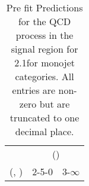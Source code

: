 \begin{table}[h!]
\tiny
\centering
\caption{Pre fit Predictions for the QCD process in the signal region for 2.1\ifb for monojet categories. All entries are non-zero but are truncated to one decimal place.\label{tab:predsep_sig_qcd_mono}}
\begin{tabular}
{ccc}
	\hline\hline
	& \multicolumn{2}{c}{\scalht (\gev)} \\ 
	 (\njet,  \nb) & 2-5-0 & 3-$\infty$ \\ [0.8ex] 
\hline
	\hline
	\hline
\end{tabular}
\end{table}
